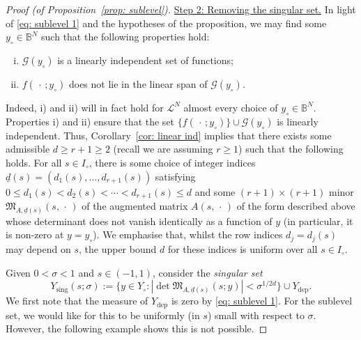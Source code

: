 \documentclass[reqno]{amsart}
\numberwithin{equation}{section}
\newcommand{\B}{\mathbb{B}}
\newcommand{\cG}{\mathcal{G}}
\newcommand{\cL}{\mathcal{L}}
\newcommand{\fM}{\mathfrak{M}}
\theoremstyle{plain}
\theoremstyle{definition}
\begin{document}
\begin{proof}[Proof (of Proposition~\ref{prop: sublevel})]



\noindent \underline{Step 2: Removing the singular set.} In light of \eqref{eq: sublevel 1} and the hypotheses of the proposition, we may find some $y_{\circ} \in \B^N$ such that the following properties hold:
    \begin{enumerate}[i)]
        \item $\cG(y_{\circ})$ is a linearly independent set of functions;
        \item $f(\,\cdot\,; y_{\circ})$ does not lie in the linear span of $\cG(y_{\circ})$.
    \end{enumerate}
    Indeed, i) and ii) will in fact hold for $\cL^N$ almost every choice of $y_{\circ} \in \B^N$. Properties i) and ii) ensure that the set $\{f(\,\cdot\,; y_{\circ})\} \cup \cG(y_{\circ})$ is linearly independent. Thus, Corollary~\ref{cor: linear ind} implies that there exists some admissible $d \geq r+1 \geq 2$ (recall we are assuming $r\geq 1$) such that the following holds. For all $s \in I_{\circ}$, there is some choice of integer indices ${\underline{d}}(s) = (d_1(s), \ldots, d_{r+1}(s))$
satisfying $0 \leq d_1(s) < d_2(s) < \cdots < d_{r+1}(s) \leq d$ and some $(r+1) \times (r+1)$ minor $\fM_{A,{\underline{d}}(s)}(s,\,\cdot\,)$ of the augmented matrix $A(s,\,\cdot\,)$
    of the form described above whose determinant does not vanish identically as a function of $y$ (in particular, it is non-zero at $y = y_{\circ}$). We emphasise that, whilst the row indices $d_j = d_j(s)$ may depend on $s$, the upper bound $d$ for these indices is uniform over all $s \in I_{\circ}$.

Given $0<\sigma < 1$ and $s\in (-1,1)$, consider the \textit{singular set} 
\begin{equation}\label{eq: sublevel 3.5}
    Y_{\mathrm{sing}}(s; \sigma) := \big\{ y \in Y_{\circ} : |\det \fM_{A, {\underline{d}}(s)}(s; y)| < \sigma^{1/2d} \big\} \cup Y_{\mathrm{dep}}.
\end{equation}
We first note that the measure of $Y_{\mathrm{dep}}$ is zero by \eqref{eq: sublevel 1}. For the sublevel set, we
would like for this to be uniformly (in $s$) small with respect to $\sigma$. 
However, the following example shows this is not possible.


\end{proof}
\end{document}

